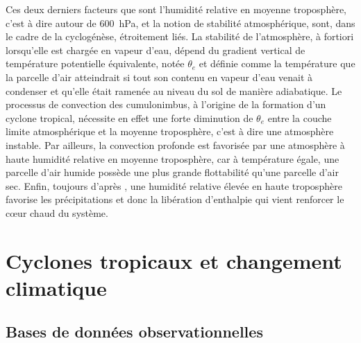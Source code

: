 \documentclass[../main.tex]{subfiles}
\begin{document}
Ces deux derniers facteurs que sont l'humidité relative en moyenne troposphère, c'est à dire autour de \SI{600}{\hecto\pascal}, et la notion de stabilité atmosphérique, sont, dans le cadre de la cyclogénèse, étroitement liés. La stabilité de l'atmosphère, à fortiori lorsqu'elle est chargée en vapeur d'eau, dépend du gradient vertical de température potentielle équivalente, notée $\theta_e$ et définie comme la température que la parcelle d'air atteindrait si tout son contenu en vapeur d'eau
venait à condenser et qu'elle était ramenée au niveau du sol de manière adiabatique. Le processus de convection des cumulonimbus, à l'origine de la formation d'un cyclone tropical, nécessite en effet une forte diminution de $\theta_e$ entre la couche limite atmosphérique et la moyenne troposphère, c'est à dire une atmosphère instable. Par ailleurs, la convection profonde est favorisée par une atmosphère à haute humidité relative en moyenne troposphère, car à température égale, une
parcelle d'air humide possède une plus grande flottabilité qu'une parcelle d'air sec. Enfin, toujours d'après \cite{gray_tropical_1975}, une humidité relative élevée en haute troposphère favorise les précipitations et donc la libération d'enthalpie qui vient renforcer le cœur chaud du système.

% 
% 
% 
% 

\section{Cyclones tropicaux et changement climatique}

\subsection{Bases de données observationnelles}
\end{document}
